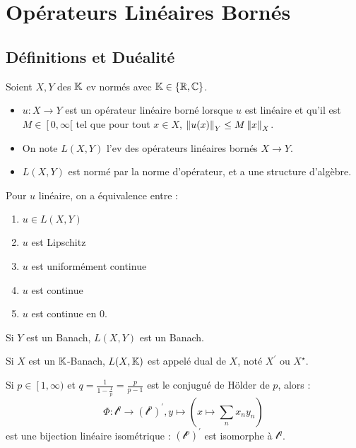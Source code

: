 \documentclass{cours}
\begin{document}
\section{Opérateurs Linéaires Bornés}
\subsection{Définitions et Duéalité}
\begin{definition}
    Soient $X, Y$ des $\mathbb{K}$ ev normés avec $\mathbb{K} \in \left\{\mathbb{R}, \mathbb{C}\right\}$.
    \begin{itemize}
        \item $u : X \to Y$ est un opérateur linéaire borné lorsque $u$ est linéaire et qu'il est $M\in \left[0,\infty[\right.$ tel que pour tout $x \in X$, $\left\lVert u(x) \right\rVert_{Y} \leq M\left\lVert x \right\rVert_{X}$.
        \item On note $L(X, Y)$ l'ev des opérateurs linéaires bornés $X \to Y$.
        \item $L(X, Y)$ est normé par la norme d'opérateur, et a une structure d'algèbre.
    \end{itemize}
\end{definition}

\begin{lemma}
    Pour $u$ linéaire, on a équivalence entre :
    \begin{enumerate}
        \item $u \in L(X, Y)$
        \item $u$ est Lipschitz
        \item $u$ est uniformément continue
        \item $u$ est continue
        \item $u$ est continue en $0$.
    \end{enumerate}
\end{lemma}

\begin{lemma}
    Si $Y$ est un Banach, $L(X, Y)$ est un Banach.
\end{lemma}

\begin{definition}
    Si $X$ est un $\mathbb{K}$-Banach, $L(X, \mathbb{K})$ est appelé dual de $X$, noté $X^{'}$ ou $X^{\star}$.
\end{definition}

\begin{theorem}
    Si $p \in \left[1, \infty)\right.$ et $q = \frac{1}{1 - \frac{1}{p}} = \frac{p}{p-1}$ est le conjugué de Hölder de $p$, alors :
    \[
        \Phi : \mathcal{l}^{q} \rightarrow \left(\mathcal{l}^{p}\right)^{'}, y \mapsto \left(x \mapsto \sum_{n} x_{n}y_{n}\right)
    \]
    est une bijection linéaire isométrique : $(\mathcal{l}^p)^{'}$ est isomorphe à $\mathcal{l}^{q}$.
\end{theorem}
\end{document}
